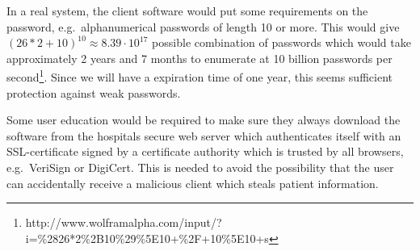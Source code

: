 \documentclass[10pt, a4paper]{article}
\begin{document}
In a real system, the client software would put some requirements on the password, e.g.~alphanumerical passwords of length 10 or more. This would give $(26*2 + 10)^{10} \approx 8.39\cdot 10^{17}$ possible combination of passwords which would take approximately 2 years and 7 months to enumerate at 10 billion passwords per second\footnote{http://www.wolframalpha.com/input/?i=\%2826*2\%2B10\%29\%5E10+\%2F+10\%5E10+s}. Since we will have a expiration time of one year, this seems sufficient protection against weak passwords.

Some user education would be required to make sure they always download the software from the hospitals secure web server which authenticates itself with an SSL-certificate signed by a certificate authority which is trusted by all browsers, e.g.~VeriSign or DigiCert. This is needed to avoid the possibility that the user can accidentally receive a malicious client which steals patient information.
\end{document}
